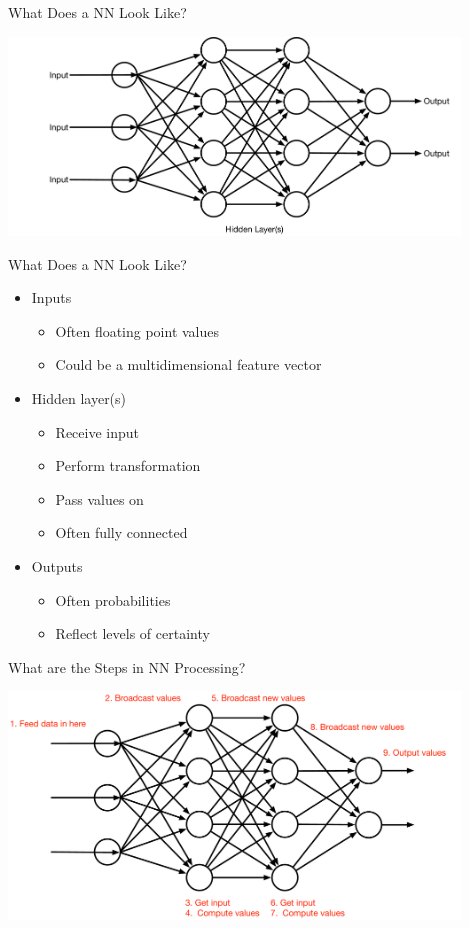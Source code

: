 \documentclass[aspectratio=169]{beamer}
\begin{document}
\begin{frame}{What Does a NN Look Like?}

\includegraphics[width=0.9\textwidth]{lectFF/nn.pdf}
\end{frame}
\begin{frame}{What Does a NN Look Like?}

\begin{itemize}
	\item Inputs
	\begin{itemize}
                \item Often floating point values
                \item Could be a multidimensional feature vector
	\end{itemize}	
	\item Hidden layer(s)
	\begin{itemize}
                \item Receive input
                \item Perform transformation
                \item Pass values on
                \item Often fully connected
	\end{itemize}	
	\item Outputs
	\begin{itemize}
                \item Often probabilities
                \item Reflect levels of certainty %
	\end{itemize}	
\end{itemize}

\end{frame}
\begin{frame}{What are the Steps in NN Processing?}

\includegraphics[width=0.9\textwidth]{lectFF/nnSteps.pdf}
\end{frame}
\end{document}
